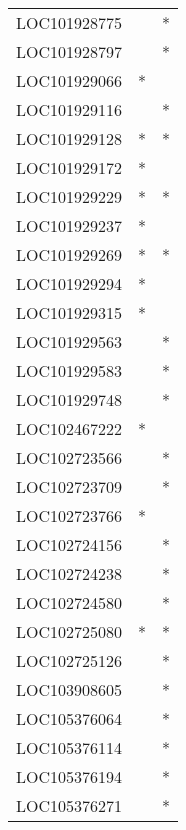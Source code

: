 \begin{longtable}{lcc}
LOC101928775          &                &          * \\
LOC101928797          &                &          * \\
LOC101929066          &              * &            \\
LOC101929116          &                &          * \\
LOC101929128          &              * &          * \\
LOC101929172          &              * &            \\
LOC101929229          &              * &          * \\
LOC101929237          &              * &            \\
LOC101929269          &              * &          * \\
LOC101929294          &              * &            \\
LOC101929315          &              * &            \\
LOC101929563          &                &          * \\
LOC101929583          &                &          * \\
LOC101929748          &                &          * \\
LOC102467222          &              * &            \\
LOC102723566          &                &          * \\
LOC102723709          &                &          * \\
LOC102723766          &              * &            \\
LOC102724156          &                &          * \\
LOC102724238          &                &          * \\
LOC102724580          &                &          * \\
LOC102725080          &              * &          * \\
LOC102725126          &                &          * \\
LOC103908605          &                &          * \\
LOC105376064          &                &          * \\
LOC105376114          &                &          * \\
LOC105376194          &                &          * \\
LOC105376271          &                &          * \\

\end{longtable}
